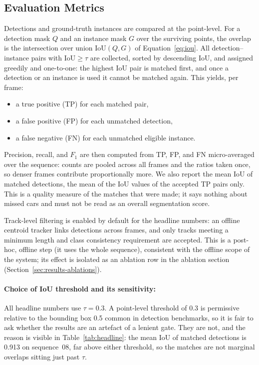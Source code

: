 \subsection{Evaluation Metrics}
\label{sec:eval-matching}

Detections and ground-truth instances are compared at the point-level.
For a detection mask $Q$ and an instance mask $G$ over the surviving points, the
overlap is the intersection over union $\mathrm{IoU}(Q,G)$ of Equation~\eqref{eq:iou}.
All detection--instance pairs with $\mathrm{IoU} \geq \tau$ are collected, sorted
by descending IoU, and assigned greedily and one-to-one: the highest IoU
pair is matched first, and once a detection or an instance is used it cannot be
matched again. This yields, per frame:
\begin{itemize}
  \item a true positive (TP) for each matched pair,
  \item a false positive (FP) for each unmatched detection,
  \item a false negative (FN) for each unmatched eligible instance.
\end{itemize}
Precision, recall, and $F_1$ are then computed from TP, FP, and FN
micro-averaged over the sequence: counts are pooled across all frames and
the ratios taken once, so denser frames contribute proportionally more. We also
report the mean IoU of matched detections, the mean of the IoU values
of the accepted TP pairs only. This is a quality measure of the matches that were
made; it says nothing about missed cars and must not be read as an overall
segmentation score.

Track-level filtering is enabled by default for the headline numbers: an offline
centroid tracker links detections across frames, and only tracks meeting a
minimum length and class consistency requirement are accepted. This is a
post-hoc, offline step (it uses the whole sequence), consistent with the
offline scope of the system; its effect is isolated as an ablation row in the
ablation section (Section~\ref{sec:results-ablations}).

\paragraph{Choice of IoU threshold and its sensitivity:}
\label{sec:eval-iou-threshold}

All headline numbers use $\tau = 0.3$. A point-level threshold of 0.3 is
permissive relative to the bounding box 0.5 common in detection benchmarks, so
it is fair to ask whether the results are an artefact of a lenient gate. They
are not, and the reason is visible in Table~\ref{tab:headline}: the mean IoU of
matched detections is \num{0.913} on sequence~08, far above either threshold, so
the matches are not marginal overlaps sitting just past $\tau$.

